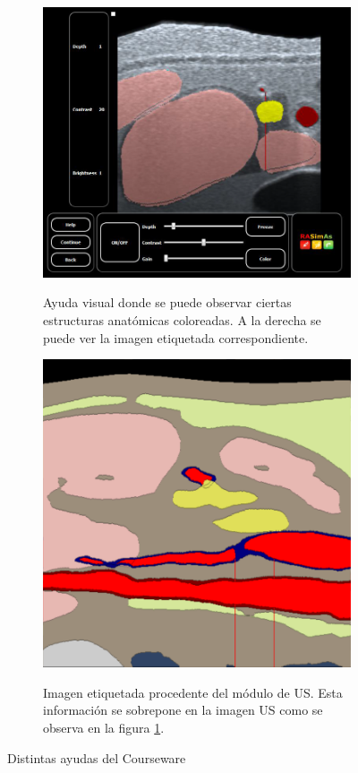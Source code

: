 \begin{figure}[h]
\begin{subfigure}[b]{0.55\linewidth}
        {\includegraphics[width=\linewidth]{IMG/labelus.png}}
        \caption{Ayuda visual donde se puede observar ciertas estructuras anatómicas coloreadas. A la derecha se puede ver la imagen etiquetada correspondiente.
    \label{fig:labelus}}
    \end{subfigure}
    \null\hfill
     \begin{subfigure}[b]{0.4\linewidth}
        \centering
        {\includegraphics[width=\linewidth]{IMG/labels.png}}
        \caption{Imagen etiquetada procedente del módulo de \ac{US}. Esta información se sobrepone en la imagen \ac{US} como se observa en la figura \ref{fig:labelus}.
    \label{fig:etiquetas}}
    \end{subfigure}
    \caption{Distintas ayudas del \ac{Courseware}}
   \end{figure}
 
